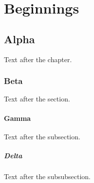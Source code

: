 \documentclass{report}
\begin{document}
\part{Beginnings}
\chapter{Alpha}
Text after the chapter.
\section{Beta}
Text after the section.
\subsection{Gamma}
Text after the subsection.
\subsubsection{Delta}
Text after the subsubsection.
\end{document}
